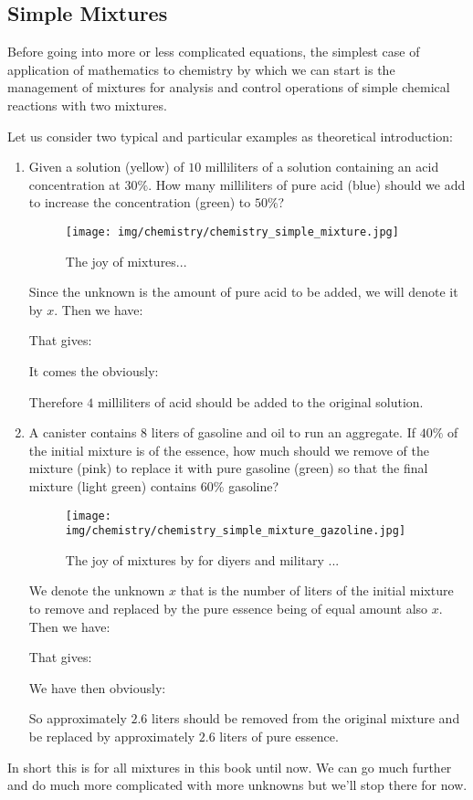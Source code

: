 	\subsection{Simple Mixtures}
	Before going into more or less complicated equations, the simplest case of application of mathematics to chemistry by which we can start is the management of mixtures for analysis and control operations of simple chemical reactions with two mixtures.
	
	Let us consider two typical and particular examples as theoretical introduction:
	\begin{enumerate}
		\item Given a solution (yellow) of $10$ milliliters of a solution containing an acid concentration at $30\%$. How many milliliters of pure acid (blue) should we add to increase the concentration (green) to $50\%$?
		\begin{figure}[H]
			\begin{center}
			\texttt{[image: img/chemistry/chemistry\_simple\_mixture.jpg]}
			\end{center}	
			\caption{The joy of mixtures...}
		\end{figure}
		Since the unknown is the amount of pure acid to be added, we will denote it by $x$. Then we have:
		
		That gives:
		
		It comes the obviously:
		
		Therefore $4$ milliliters of acid should be added to the original solution.
		
		\item  A canister contains $8$ liters of gasoline and oil to run an aggregate. If $40\%$ of the initial mixture is of the essence, how much should we remove of the mixture (pink) to replace it with pure gasoline (green) so that the final mixture (light green) contains $60\%$ gasoline?
		\begin{figure}[H]
			\begin{center}
			\texttt{[image: img/chemistry/chemistry\_simple\_mixture\_gazoline.jpg]}
			\end{center}	
			\caption{The joy of mixtures by for diyers and military ...}
		\end{figure}
		We denote the unknown $x$ that is the number of liters of the initial mixture to remove and replaced by the pure essence being of equal amount also $x$. Then we have:
		
		That gives:
		
		We have then obviously:
		
		So approximately $2.6$ liters should be removed from the original mixture and be replaced by approximately $2.6$ liters of pure essence.
	\end{enumerate}
	In short this is for all mixtures in this book until now. We can go much further and do much more complicated with more unknowns but we'll stop there for now.
	
